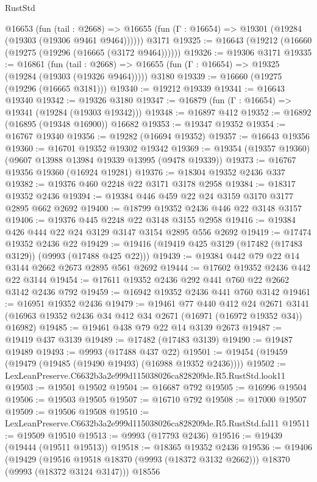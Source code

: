 \begin{lexlean}{RustStd}
\begin{coremodule}
    @16653
      (fun (tail : @2668) =>
      @16655 (fun (Γ : @16654) => @19301 (@19284 (@19303 (@19306 @9461 @9464))))))
    @3171
@19325 := @16643 (@19212 (@16660 (@19275 (@19296 (@16665 (@3172 @9464))))))
@19326 := @19306 @3171
@19335 := @16861
    (fun (tail : @2668) => @16655 (fun (Γ : @16654) => @19325 (@19284 (@19303 (@19326 @9464)))))
    @3180
@19339 := @16660 (@19275 (@19296 (@16665 @3181)))
@19340 := @19212 @19339
@19341 := @16643 @19340
@19342 := @19326 @3180
@19347 := @16879 (fun (Γ : @16654) => @19341 (@19284 (@19303 @19342)))
@19348 := @16897 @412
@19352 := @16892 (@16895 (@19348 @16900)) @16682
@19353 := @19347 @19352
@19354 := @16767 @19340
@19356 := @19282 (@16694 @19352)
@19357 := @16643 @19356
@19360 := @16701 @19352 @19302 @19342
@19369 := @19354 (@19357 @19360) (@9607 @13988 @13984 @19339 @13995 (@9478 @19339))
@19373 := @16767 @19356 @19360 (@16924 @19281)
@19376 := @18304 @19352 @2436 @337
@19382 := @19376 @460 @2248 @22 @3171 @3178 @2958
@19384 := @18317 @19352 @2436
@19394 := @19384 @446 @459 @22 @24 @3159 @3170 @3177 @2895 @662 @2692
@19400 := @18799 @19352 @2436 @446 @22 @3148 @3157
@19406 := @19376 @445 @2248 @22 @3148 @3155 @2958
@19416 := @19384 @426 @444 @22 @24 @3129 @3147 @3154 @2895 @556 @2692
@19419 := @17474 @19352 @2436 @22
@19429 := @19416 (@19419 @425 @3129 (@17482 (@17483 @3129)) (@9993 (@17488 @425 @22)))
@19439 := @19384 @442 @79 @22 @14 @3144 @2662 @2673 @2895 @561 @2692
@19444 := @17602 @19352 @2436 @442 @22 @3144
@19454 := @17611 @19352 @2436 @292 @441 @760 @22 @2662 @3142 @2436 @792
@19459 := @16942 @19352 @2436 @441 @760 @3142
@19461 := @16951 @19352 @2436
@19479 := @19461
    @77
    @440
    @412
    @24
    @2671
    @3141
    (@16963 @19352 @2436 @34 @412 @34 @2671 (@16971 (@16972 @19352 @34)) @16982)
@19485 := @19461 @438 @79 @22 @14 @3139 @2673
@19487 := @19419 @437 @3139
@19489 := @17482 (@17483 @3139)
@19490 := @19487 @19489
@19493 := @9993 (@17488 @437 @22)
@19501 := @19454 (@19459 (@19479 (@19485 (@19490 @19493) (@16988 @19352 @2436))))
@19502 := LexLeanPreserve.C6632b3a2e999d115038026ca828209de.R5.RustStd.look11
@19503 := @19501 @19502
@19504 := @16687 @792
@19505 := @16996 @19504
@19506 := @19503 @19505
@19507 := @16710 @792
@19508 := @17000 @19507
@19509 := @19506 @19508
@19510 := LexLeanPreserve.C6632b3a2e999d115038026ca828209de.R5.RustStd.fal11
@19511 := @19509 @19510
@19513 := @9993 (@17793 @2436)
@19516 := @19439 (@19444 (@19511 @19513))
@19518 := @18365 @19352 @2436
@19536 := @19406
    (@19429 (@19516 @19518 @18370 (@9993 (@18372 @3132 @2662))) @18370 (@9993 (@18372 @3124 @3147)))
    @18556

\end{coremodule}
\end{lexlean}
